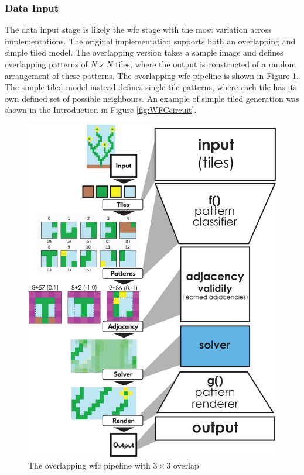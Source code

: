 \subsubsection{Data Input}
The data input stage is likely the \acrshort{wfc} stage with the most variation across implementations. The original implementation \cite{Gumin_Wave_Function_Collapse_2016} supports both an overlapping and simple tiled model. The overlapping version takes a sample image and defines overlapping patterns of \(N\times N\) tiles, where the output is constructed of a random arrangement of these patterns. The overlapping \acrshort{wfc} pipeline is shown in Figure \ref{fig:overlappingWFC}. The simple tiled model instead defines single tile patterns, where each tile has its own defined set of possible neighbours. An example of simple tiled generation was shown in the Introduction in Figure \ref{fig:WFCcircuit}.

\begin{figure}[H]
    \centering
    \includegraphics[width=\textwidth, height=0.5\textheight, keepaspectratio]{Images/OverlappingWFC.jpg}
    \caption{The overlapping \acrshort{wfc} pipeline with \(3\times 3\) overlap \cite{WFC_ConstraintSolving_and_ML}}
    \label{fig:overlappingWFC}
\end{figure}

